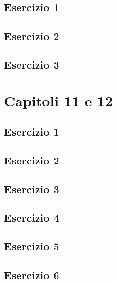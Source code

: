 \documentclass[a4paper,12pt,oneside]{book}
\begin{document}
\hypertarget{esercizio-1-6}{%
\subsection{Esercizio 1}\label{esercizio-1-6}}

\hypertarget{esercizio-2-5}{%
\subsection{Esercizio 2}\label{esercizio-2-5}}

\hypertarget{esercizio-3-5}{%
\subsection{Esercizio 3}\label{esercizio-3-5}}

\hypertarget{capitoli-11-e-12}{%
\section{Capitoli 11 e 12}\label{capitoli-11-e-12}}

\hypertarget{esercizio-1-7}{%
\subsection{Esercizio 1}\label{esercizio-1-7}}

\hypertarget{esercizio-2-6}{%
\subsection{Esercizio 2}\label{esercizio-2-6}}

\hypertarget{esercizio-3-6}{%
\subsection{Esercizio 3}\label{esercizio-3-6}}

\hypertarget{esercizio-4-4}{%
\subsection{Esercizio 4}\label{esercizio-4-4}}

\hypertarget{esercizio-5-3}{%
\subsection{Esercizio 5}\label{esercizio-5-3}}

\hypertarget{esercizio-6-2}{%
\subsection{Esercizio 6}\label{esercizio-6-2}}
\end{document}
